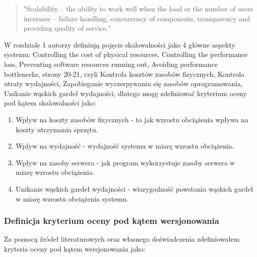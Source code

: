 \documentclass[runningheads,12pt]{llncs}
\begin{document}
\begin{quote}
    "Scalability – the ability to work well when the load or the number of users increases – failure handling, concurrency of components, transparency and providing quality of service." ~\cite[p. 21]{coulouris2011distributed}
\end{quote}

W rozdziale 1 autorzy definiują pojęcie skalowalności jako 4 główne aspekty systemu: Controlling the cost of physical resources, Controlling the performance loss, Preventing software resources running out, Avoiding performance bottlenecks, strony 20-21, czyli Kontrola kosztów zasobów fizycznych, Kontrola utraty wydajności, Zapobieganie wyczerpywaniu się zasobów oprogramowania, Unikanie wąskich gardeł wydajności, dlatego mogę zdefiniować kryterium oceny pod kątem skalowalności jako:

\begin{enumerate}
    \item Wpływ na koszty zasobów fizycznych - to jak wzrostu obciążenia wpływa na koszty utrzymania sprzętu.
    \item Wpływ na wydajność - wydajność systemu w miarę wzrostu obciążenia.
    \item Wpływ na zasoby serwera - jak program wykorzystuje zasoby serwera w miarę wzrostu obciążenia.
    \item Unikanie wąskich gardeł wydajności - wiarygodność powstania wąskich gardeł w miarę wzrostu obciążenia systemu.
\end{enumerate}

\subsubsection{Definicja kryterium oceny pod kątem wersjonowania}

Za pomocą źródeł literaturowych oraz własnego doświadczenia zdefiniowałem kryteria oceny pod kątem wersjonowania jako:
\end{document}

